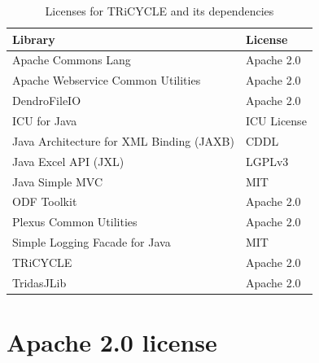 \documentclass[10pt, headsepline,DIV14,BCOR0.5cm]{scrreprt}
\begin{document}
\begin{table}[htbp]
\begin{center}
\caption{Licenses for TRiCYCLE and its dependencies}
\begin{tabular*}{12cm}{ l @{\extracolsep{\fill}} l }
  \toprule
 Library & License \\
 \midrule

Apache Commons Lang & Apache 2.0 \\ 
Apache Webservice Common Utilities & Apache 2.0 \\
DendroFileIO & Apache 2.0 \\
ICU for Java & ICU License \\
Java Architecture for XML Binding (JAXB) & CDDL \\
Java Excel API (JXL) & LGPLv3 \\
Java Simple MVC & MIT \\
ODF Toolkit & Apache 2.0 \\
Plexus Common Utilities & Apache 2.0 \\
Simple Logging Facade for Java & MIT \\
TRiCYCLE & Apache 2.0 \\
TridasJLib & Apache 2.0 \\


\bottomrule
\end{tabular*}
\end{center}
\end{table}


\section{Apache 2.0 license}
\end{document}
